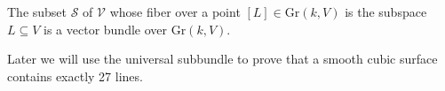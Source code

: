 \begin{proposition}
    The subset $\mathcal{S}$ of $\mathcal{V}$ whose fiber over a point $[L] \in \mathrm{Gr}(k, V)$ is the subspace $L \subseteq V$ is a vector bundle over $\mathrm{Gr}(k, V)$.
\end{proposition}

Later we will use the universal subbundle to prove that a smooth cubic surface contains exactly 27 lines. 



